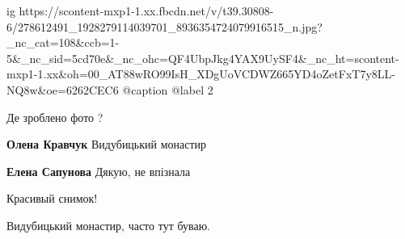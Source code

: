  
 
 
 
 

\ifcmt
  ig https://scontent-mxp1-1.xx.fbcdn.net/v/t39.30808-6/278612491_1928279114039701_8936354724079916515_n.jpg?_nc_cat=108&ccb=1-5&_nc_sid=5cd70e&_nc_ohc=QF4UbpJkg4YAX9UySF4&_nc_ht=scontent-mxp1-1.xx&oh=00_AT88wRO99IsH_XDgUoVCDWZ665YD4oZetFxT7y8LL-NQ8w&oe=6262CEC6
  @caption @label 2
\fi

Де зроблено фото ?

\textbf{Олена Кравчук} Видубицький монастир

\textbf{Елена Сапунова} Дякую, не впізнала

Красивый снимок!

Видубицький монастир, часто тут буваю.

